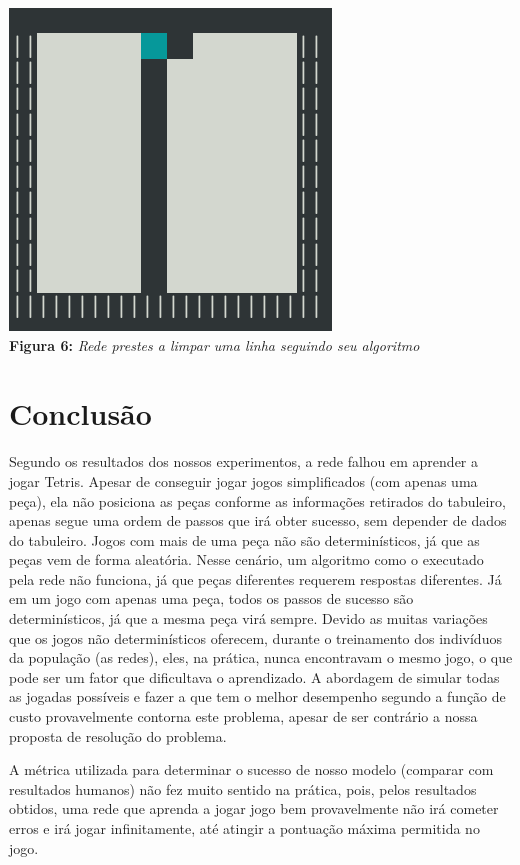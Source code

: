 \documentclass[conference]{IEEEtran}
\begin{document}
\begin{center}
\includegraphics[scale=0.3]{tetris_win.png}\\

\textbf{Figura 6:} \textit{Rede prestes a limpar uma linha seguindo seu algoritmo}
\end{center}


\section{Conclusão}
Segundo os resultados dos nossos experimentos, a rede falhou em aprender a jogar Tetris. Apesar de conseguir jogar jogos simplificados (com apenas uma peça), ela não posiciona as peças conforme as informações retirados do tabuleiro, apenas segue uma ordem de passos que irá obter sucesso, sem depender de dados do tabuleiro. Jogos com mais de uma peça não são determinísticos, já que as peças vem de forma aleatória. Nesse cenário, um algoritmo como o executado pela rede não funciona, já que peças diferentes requerem respostas diferentes. Já em um jogo com apenas uma peça, todos os passos de sucesso são determinísticos, já que a mesma peça virá sempre. Devido as muitas variações que os jogos não determinísticos oferecem, durante o treinamento dos indivíduos da população (as redes), eles, na prática, nunca encontravam o mesmo jogo, o que pode ser um fator que dificultava o aprendizado. A abordagem de simular todas as jogadas possíveis e fazer a que tem o melhor desempenho segundo a função de custo provavelmente contorna este problema, apesar de ser contrário a nossa proposta de resolução do problema. 

A métrica utilizada para determinar o sucesso de nosso modelo (comparar com resultados humanos) não fez muito sentido na prática, pois, pelos resultados obtidos, uma rede que aprenda a jogar jogo bem provavelmente não irá cometer erros e irá jogar infinitamente, até atingir a pontuação máxima permitida no jogo.
\end{document}
